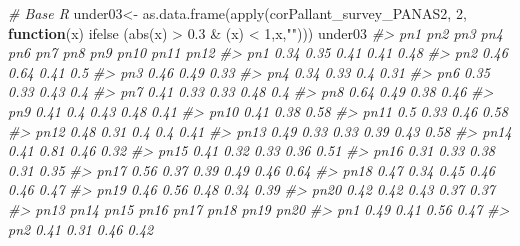 \documentclass[
]{article}
\newenvironment{Shaded}{\begin{snugshade}}{\end{snugshade}}
\newcommand{\CommentTok}[1]{\textcolor[rgb]{0.56,0.35,0.01}{\textit{#1}}}
\newcommand{\ControlFlowTok}[1]{\textcolor[rgb]{0.13,0.29,0.53}{\textbf{#1}}}
\newcommand{\DecValTok}[1]{\textcolor[rgb]{0.00,0.00,0.81}{#1}}
\newcommand{\FloatTok}[1]{\textcolor[rgb]{0.00,0.00,0.81}{#1}}
\newcommand{\FunctionTok}[1]{\textcolor[rgb]{0.00,0.00,0.00}{#1}}
\newcommand{\NormalTok}[1]{#1}
\newcommand{\OtherTok}[1]{\textcolor[rgb]{0.56,0.35,0.01}{#1}}
\newcommand{\SpecialCharTok}[1]{\textcolor[rgb]{0.00,0.00,0.00}{#1}}
\newcommand{\StringTok}[1]{\textcolor[rgb]{0.31,0.60,0.02}{#1}}
\begin{document}
\begin{Shaded}
\begin{Highlighting}[]
\CommentTok{\# Base R }
\NormalTok{under03}\OtherTok{\textless{}{-}} \FunctionTok{as.data.frame}\NormalTok{(}\FunctionTok{apply}\NormalTok{(corPallant\_survey\_PANAS2, }\DecValTok{2}\NormalTok{, }\ControlFlowTok{function}\NormalTok{(x) }\FunctionTok{ifelse}\NormalTok{ (}\FunctionTok{abs}\NormalTok{(x) }\SpecialCharTok{\textgreater{}} \FloatTok{0.3} \SpecialCharTok{\&}\NormalTok{ (x) }\SpecialCharTok{\textless{}} \DecValTok{1}\NormalTok{,x,}\StringTok{""}\NormalTok{)))}
\NormalTok{under03}
\CommentTok{\#\textgreater{}       pn1  pn2  pn3  pn4  pn6  pn7  pn8  pn9 pn10 pn11 pn12}
\CommentTok{\#\textgreater{} pn1                 0.34 0.35 0.41      0.41           0.48}
\CommentTok{\#\textgreater{} pn2            0.46                0.64      0.41  0.5     }
\CommentTok{\#\textgreater{} pn3       0.46                     0.49           0.33     }
\CommentTok{\#\textgreater{} pn4  0.34                     0.33       0.4           0.31}
\CommentTok{\#\textgreater{} pn6  0.35                     0.33      0.43            0.4}
\CommentTok{\#\textgreater{} pn7  0.41           0.33 0.33           0.48            0.4}
\CommentTok{\#\textgreater{} pn8       0.64 0.49                          0.38 0.46     }
\CommentTok{\#\textgreater{} pn9  0.41            0.4 0.43 0.48                     0.41}
\CommentTok{\#\textgreater{} pn10      0.41                     0.38           0.58     }
\CommentTok{\#\textgreater{} pn11       0.5 0.33                0.46      0.58          }
\CommentTok{\#\textgreater{} pn12 0.48           0.31  0.4  0.4      0.41               }
\CommentTok{\#\textgreater{} pn13 0.49           0.33 0.33 0.39      0.43           0.58}
\CommentTok{\#\textgreater{} pn14      0.41 0.81                0.46           0.32     }
\CommentTok{\#\textgreater{} pn15 0.41           0.32      0.33      0.36           0.51}
\CommentTok{\#\textgreater{} pn16      0.31 0.33                0.38      0.31 0.35     }
\CommentTok{\#\textgreater{} pn17 0.56           0.37 0.39 0.49      0.46           0.64}
\CommentTok{\#\textgreater{} pn18 0.47           0.34 0.45 0.46      0.46           0.47}
\CommentTok{\#\textgreater{} pn19      0.46 0.56                0.48      0.34 0.39     }
\CommentTok{\#\textgreater{} pn20      0.42 0.42                0.43      0.37 0.37     }
\CommentTok{\#\textgreater{}      pn13 pn14 pn15 pn16 pn17 pn18 pn19 pn20}
\CommentTok{\#\textgreater{} pn1  0.49      0.41      0.56 0.47          }
\CommentTok{\#\textgreater{} pn2       0.41      0.31           0.46 0.42}

\end{Highlighting}
\end{Shaded}
\end{document}
